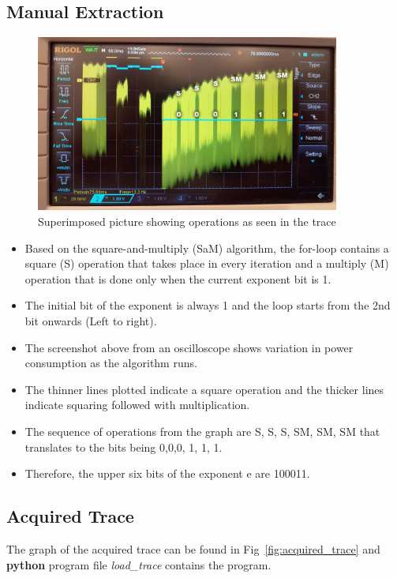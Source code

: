 \documentclass[1p,16pt]{elsarticle}
\begin{document}
\subsection{Manual Extraction}%
\label{sub:manual_extraction}

\begin{figure}[H]
	\centering
    \centerline{\includegraphics[width=10cm]{manual_extraction}}
    \caption{Superimposed picture showing operations as seen in the trace}\label{fig:manual_extraction}
\end{figure}
\begin{itemize}

\item Based on the square-and-multiply (SaM) algorithm, the for-loop contains a square (S) operation that takes place in every iteration and a multiply (M) operation that is done only when the current exponent bit is 1.

\item The initial bit of the exponent is always 1 and the loop starts from the 2nd bit onwards (Left to right). 

\item The screenshot above from an oscilloscope shows variation in power consumption as the algorithm runs.

\item The thinner lines plotted indicate a square operation and the thicker lines indicate squaring followed with multiplication.

\item The sequence of operations from the graph are S, S, S, SM, SM, SM that translates to the bits being 0,0,0, 1, 1, 1.

\item Therefore, the upper six bits of the exponent e are 100011.

\end{itemize}


\subsection{Acquired Trace}%
\label{sub:acquired_trace}
The graph of the acquired trace can be found in Fig~\ref{fig:acquired_trace} and
\textbf{python} program file \textit{load\_trace} contains the program.
\end{document}
